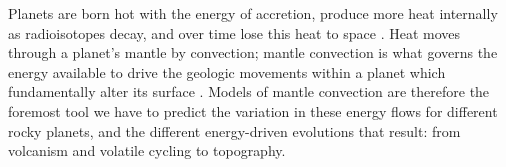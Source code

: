 

Planets are born hot with the energy of accretion, produce more heat internally as radioisotopes decay, and over time lose this heat to space \citep{schubert_whole_1980, davies_thermal_1980, moore_heatpipe_2017, lourenco_efficient_2018}. Heat moves through a planet's mantle by convection; mantle convection is what governs the energy available to drive the geologic movements within a planet which fundamentally alter its surface \citep{breuer_dynamics_2015}. Models of mantle convection are therefore the foremost tool we have to predict the variation in these energy flows for different rocky planets, and the different energy-driven evolutions that result: from volcanism and volatile cycling to topography. 

